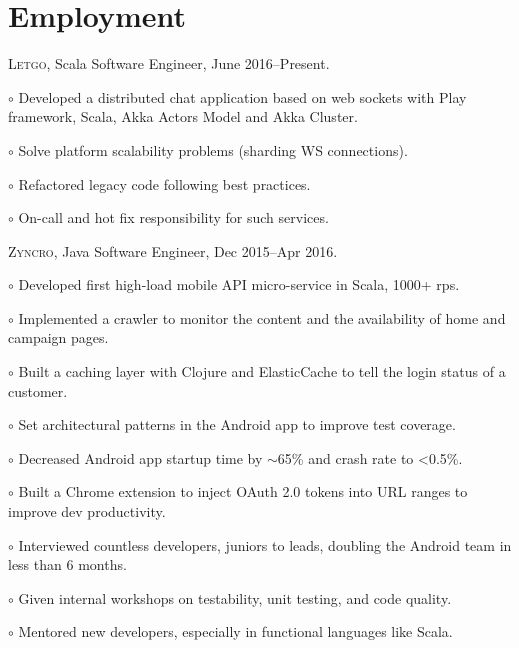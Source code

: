 \documentclass[letterpaper]{article}
\renewenvironment{itemize}{
  \begin{list}{}{
    \setlength{\leftmargin}{1.5em}
  }
}{
  \end{list}
}
\newenvironment{no-indent-itemize}{
  \begin{list}{}{
    \setlength{\leftmargin}{0em}
  }
}{
  \end{list}
}
\def\tilde{$\scriptstyle\sim$}
\def\bullet{$\circ$\xspace}
\begin{document}
\section*{Employment}
\begin{no-indent-itemize}
  \item \textsc{Letgo}, Scala Software Engineer, June 2016--Present.
  \begin{itemize}
    \item\bullet Developed a distributed chat application based on web sockets with Play framework, Scala, Akka Actors Model and Akka Cluster.
    \item\bullet Solve platform scalability problems (sharding WS connections).
    \item\bullet Refactored legacy code following best practices.
    \item\bullet On-call and hot fix responsibility for such services.
  \end{itemize}
  \item \textsc{Zyncro}, Java Software Engineer, Dec 2015--Apr 2016.
  \begin{itemize}
    \item\bullet Developed first high-load mobile API micro-service in Scala, 1000+ rps.
    \item\bullet Implemented a crawler to monitor the content and the availability of home and campaign pages.
    \item\bullet Built a caching layer with Clojure and ElasticCache to tell the login status of a customer.
    \item\bullet Set architectural patterns in the Android app to improve test coverage.
    \item\bullet Decreased Android app startup time by \tilde 65\% and crash rate to <0.5\%.
    \item\bullet Built a Chrome extension to inject OAuth 2.0 tokens into URL ranges to improve dev productivity.
    \item\bullet Interviewed countless developers, juniors to leads, doubling the Android team in less than 6 months.
    \item\bullet Given internal workshops on testability, unit testing, and code quality.
    \item\bullet Mentored new developers, especially in functional languages like Scala.

\end{itemize}
\end{no-indent-itemize}
\end{document}
